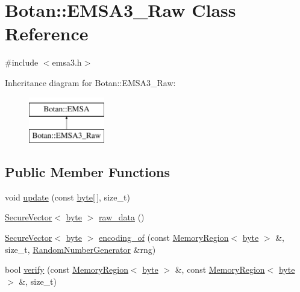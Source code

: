 \hypertarget{classBotan_1_1EMSA3__Raw}{\section{Botan\-:\-:E\-M\-S\-A3\-\_\-\-Raw Class Reference}
\label{classBotan_1_1EMSA3__Raw}
}


{\ttfamily \#include $<$emsa3.\-h$>$}

Inheritance diagram for Botan\-:\-:E\-M\-S\-A3\-\_\-\-Raw\-:\begin{figure}[H]
\begin{center}
\leavevmode
\includegraphics[height=2.000000cm]{classBotan_1_1EMSA3__Raw}
\end{center}
\end{figure}
\subsection*{Public Member Functions}
\begin{DoxyCompactItemize}
\item 
void \hyperlink{classBotan_1_1EMSA3__Raw_a7f3f7e2f3aebd8bf767c7dbb4d6a9577}{update} (const \hyperlink{namespaceBotan_a7d793989d801281df48c6b19616b8b84}{byte}\mbox{[}$\,$\mbox{]}, size\-\_\-t)
\item 
\hyperlink{classBotan_1_1SecureVector}{Secure\-Vector}$<$ \hyperlink{namespaceBotan_a7d793989d801281df48c6b19616b8b84}{byte} $>$ \hyperlink{classBotan_1_1EMSA3__Raw_a1e009505ccf237051d2e2cc7ffdc6b98}{raw\-\_\-data} ()
\item 
\hyperlink{classBotan_1_1SecureVector}{Secure\-Vector}$<$ \hyperlink{namespaceBotan_a7d793989d801281df48c6b19616b8b84}{byte} $>$ \hyperlink{classBotan_1_1EMSA3__Raw_a8136838bbf0a2f00a9c67929e84c5f87}{encoding\-\_\-of} (const \hyperlink{classBotan_1_1MemoryRegion}{Memory\-Region}$<$ \hyperlink{namespaceBotan_a7d793989d801281df48c6b19616b8b84}{byte} $>$ \&, size\-\_\-t, \hyperlink{classBotan_1_1RandomNumberGenerator}{Random\-Number\-Generator} \&rng)
\item 
bool \hyperlink{classBotan_1_1EMSA3__Raw_a5c1a74cba9c601f5977eb6ac3d9cb57b}{verify} (const \hyperlink{classBotan_1_1MemoryRegion}{Memory\-Region}$<$ \hyperlink{namespaceBotan_a7d793989d801281df48c6b19616b8b84}{byte} $>$ \&, const \hyperlink{classBotan_1_1MemoryRegion}{Memory\-Region}$<$ \hyperlink{namespaceBotan_a7d793989d801281df48c6b19616b8b84}{byte} $>$ \&, size\-\_\-t)
\end{DoxyCompactItemize}


